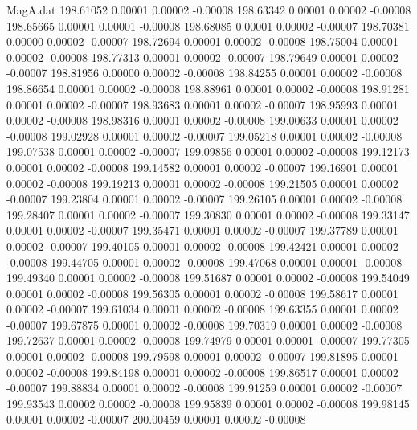 \begin{filecontents}{MagA.dat}
 198.61052    0.00001    0.00002   -0.00008
 198.63342    0.00001    0.00002   -0.00008
 198.65665    0.00001    0.00001   -0.00008
 198.68085    0.00001    0.00002   -0.00007
 198.70381    0.00000    0.00002   -0.00007
 198.72694    0.00001    0.00002   -0.00008
 198.75004    0.00001    0.00002   -0.00008
 198.77313    0.00001    0.00002   -0.00007
 198.79649    0.00001    0.00002   -0.00007
 198.81956    0.00000    0.00002   -0.00008
 198.84255    0.00001    0.00002   -0.00008
 198.86654    0.00001    0.00002   -0.00008
 198.88961    0.00001    0.00002   -0.00008
 198.91281    0.00001    0.00002   -0.00007
 198.93683    0.00001    0.00002   -0.00007
 198.95993    0.00001    0.00002   -0.00008
 198.98316    0.00001    0.00002   -0.00008
 199.00633    0.00001    0.00002   -0.00008
 199.02928    0.00001    0.00002   -0.00007
 199.05218    0.00001    0.00002   -0.00008
 199.07538    0.00001    0.00002   -0.00007
 199.09856    0.00001    0.00002   -0.00008
 199.12173    0.00001    0.00002   -0.00008
 199.14582    0.00001    0.00002   -0.00007
 199.16901    0.00001    0.00002   -0.00008
 199.19213    0.00001    0.00002   -0.00008
 199.21505    0.00001    0.00002   -0.00007
 199.23804    0.00001    0.00002   -0.00007
 199.26105    0.00001    0.00002   -0.00008
 199.28407    0.00001    0.00002   -0.00007
 199.30830    0.00001    0.00002   -0.00008
 199.33147    0.00001    0.00002   -0.00007
 199.35471    0.00001    0.00002   -0.00007
 199.37789    0.00001    0.00002   -0.00007
 199.40105    0.00001    0.00002   -0.00008
 199.42421    0.00001    0.00002   -0.00008
 199.44705    0.00001    0.00002   -0.00008
 199.47068    0.00001    0.00001   -0.00008
 199.49340    0.00001    0.00002   -0.00008
 199.51687    0.00001    0.00002   -0.00008
 199.54049    0.00001    0.00002   -0.00008
 199.56305    0.00001    0.00002   -0.00008
 199.58617    0.00001    0.00002   -0.00007
 199.61034    0.00001    0.00002   -0.00008
 199.63355    0.00001    0.00002   -0.00007
 199.67875    0.00001    0.00002   -0.00008
 199.70319    0.00001    0.00002   -0.00008
 199.72637    0.00001    0.00002   -0.00008
 199.74979    0.00001    0.00001   -0.00007
 199.77305    0.00001    0.00002   -0.00008
 199.79598    0.00001    0.00002   -0.00007
 199.81895    0.00001    0.00002   -0.00008
 199.84198    0.00001    0.00002   -0.00008
 199.86517    0.00001    0.00002   -0.00007
 199.88834    0.00001    0.00002   -0.00008
 199.91259    0.00001    0.00002   -0.00007
 199.93543    0.00002    0.00002   -0.00008
 199.95839    0.00001    0.00002   -0.00008
 199.98145    0.00001    0.00002   -0.00007
 200.00459    0.00001    0.00002   -0.00008

\end{filecontents}
